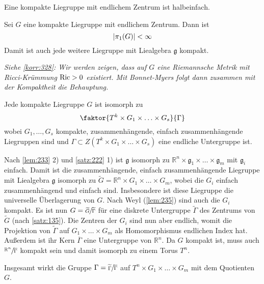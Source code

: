 \begin{korollarB}[{name=[kompakte Liegruppe mit endlichem Zentrum halbeinfach]}]
	Eine kompakte Liegruppe mit endlichem Zentrum ist halbeinfach.
\end{korollarB}

\begin{lemma}[{name={Weyl}},label=lem:235]
	Sei $G$ eine kompakte Liegruppe mit endlichem Zentrum.
	Dann ist 
	\[
		\abs*{\pi_1(G)} < \infty
	\]
	Damit ist auch jede weitere Liegruppe mit Liealgebra $\mathfrak{g}$ kompakt.
\end{lemma}
\begin{beweis}
	\emph{Siehe \autoref{korr:328}: Wir werden zeigen, dass auf $G$ eine Riemannsche Metrik mit Ricci-Krümmung $\Ric >0$ existiert. Mit Bonnet-Myers folgt dann zusammen mit der Kompaktheit die Behauptung.}
\end{beweis}

\begin{korollar}[{name=[Isomorphie kompakte Liegruppe]}]
	Jede kompakte Liegruppe $G$ ist isomorph zu 
	\[
		\faktor{T^k \times G_1 \times \ldots \times G_s}{\Gamma}
	\]
	wobei $G_1, \ldots ,G_s$ kompakte, zusammenhängende, einfach zusammenhängende Liegruppen sind und $\Gamma \subset Z(T^k \times G_1 \times \ldots \times G_s)$ eine endliche Untergruppe ist.
\end{korollar}
\begin{beweis}
	Nach \autoref{lem:233} 2) und \autoref{satz:222} 1) ist $\mathfrak{g}$ isomorph zu $\mathbb{R}^n \times \mathfrak{g}_1 \times \ldots \times \mathfrak{g}_m$ mit $\mathfrak{g}_i$ einfach.
	Damit ist die zusammenhängende, einfach zusammenhängende Liegruppe mit Liealgebra $\mathfrak{g}$ isomorph zu $\widetilde{G} = \mathbb{R}^n \times G_1 \times \ldots \times G_m$, wobei die $G_i$ einfach zusammenhängend und einfach sind. 
	Insbesondere ist diese Liegruppe die universelle Überlagerung von $G$.
	Nach Weyl (\autoref{lem:235}) sind auch die $G_i$ kompakt.
	Es ist nun $G = \sfrac{\widetilde{G}}{\widetilde{\Gamma}}$ für eine diskrete Untergruppe $\widetilde{\Gamma}$ des Zentrums von $\widetilde{G}$ (nach \autoref{satz:135}).
	Die Zentren der $G_i$ sind nun aber endlich, womit die Projektion von $\widetilde{\Gamma}$ auf $G_1\times \ldots \times G_m$ als Homomorphismus endlichen Index hat.
	Außerdem ist ihr Kern $\overline{\Gamma}$ eine Untergruppe von $\mathbb{R}^n$.
	Da $G$ kompakt ist, muss auch $\sfrac{\mathbb{R}^n}{\overline{\Gamma}}$ kompakt sein und damit isomorph zu einem Torus $T^n$.
	
	Insgesamt wirkt die Gruppe $\Gamma = \sfrac{\widetilde{\Gamma}}{\overline{\Gamma}}$ auf $T^n \times G_1 \times \ldots \times G_m$ mit dem Quotienten $G$.
\end{beweis}

